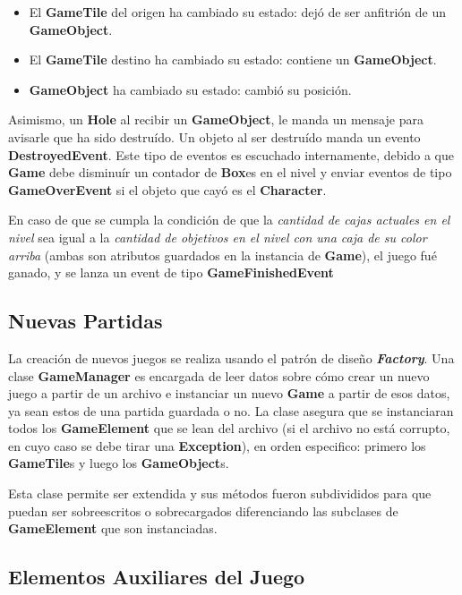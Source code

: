 \documentclass[a4paper,12pt,titlepage]{article}
\begin{document}
\begin{itemize}
	\item El \textbf{GameTile} del origen ha cambiado su estado: dejó de ser anfitrión de un \textbf{GameObject}.
	\item El \textbf{GameTile} destino ha cambiado su estado: contiene un \textbf{GameObject}.
	\item \textbf{GameObject} ha cambiado su estado: cambió su posición.
\end{itemize}

Asimismo, un \textbf{Hole} al recibir un \textbf{GameObject}, le manda un mensaje para avisarle que ha sido destruído. Un objeto al ser destruído manda un evento \textbf{DestroyedEvent}. Este tipo de eventos es escuchado internamente, debido a que \textbf{Game} debe disminuír un contador de \textbf{Box}es en el nivel y enviar eventos de tipo \textbf{GameOverEvent} si el objeto que cayó es el \textbf{Character}.

En caso de que se cumpla la condición de que la \emph{cantidad de cajas actuales en el nivel} sea igual a la \emph{cantidad de objetivos en el nivel con una caja de su color arriba} (ambas son atributos guardados en la instancia de \textbf{Game}), el juego fué ganado, y se lanza un event de tipo \textbf{GameFinishedEvent}

\subsection{Nuevas Partidas}

La creación de nuevos juegos se realiza usando el patrón de diseño \textbf{\emph{Factory}}. Una clase \textbf{GameManager} es encargada de leer datos sobre cómo crear un nuevo juego a partir de un archivo e instanciar un nuevo \textbf{Game} a partir de esos datos, ya sean estos de una partida guardada o no. La clase asegura que se instanciaran todos los \textbf{GameElement} que se lean del archivo (si el archivo no está corrupto, en cuyo caso se debe tirar una \textbf{Exception}), en orden especifico: primero los \textbf{GameTile}s y luego los \textbf{GameObject}s.

Esta clase permite ser extendida y sus métodos fueron subdivididos para que puedan ser sobreescritos o sobrecargados diferenciando las subclases de \textbf{GameElement} que son instanciadas. 

\subsection{Elementos Auxiliares del Juego}
\end{document}
